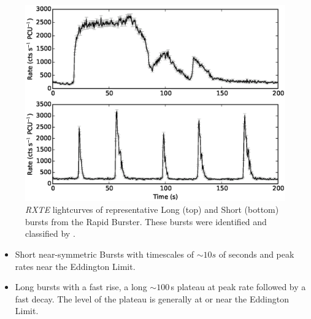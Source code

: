 \begin{figure}
  \centering
  \includegraphics[width=.9\linewidth, trim={0.8cm 0 1.4cm 0},clip]{images/bagnoli_bursts.eps}
  \caption{\small  \textit{RXTE} lightcurves of representative Long (top) and Short (bottom) bursts from the Rapid Burster.  These bursts were identified and classified by \citet{Bagnoli_PopStudy}.}
  \label{fig:bagnoli_lcs}
\end{figure}

\begin{itemize}
\item Short near-symmetric Bursts with timescales of $\sim10s$ of seconds and peak rates near the Eddington Limit.
\item Long bursts with a fast rise, a long $\sim100$\,s plateau at peak rate followed by a fast decay.  The level of the plateau is generally at or near the Eddington Limit.
\end{itemize}

